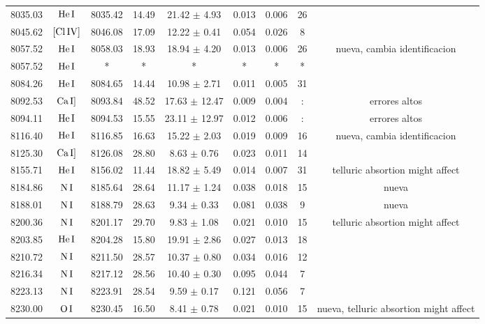 \documentclass{article}
\begin{document}
\begin{table*}
\begin{adjustbox}{width=\textwidth}
\begin{tabular}{ccccccccc}
8035.03 & $\mbox{He}\thinspace \mbox{I}$ & 8035.42 & 14.49 & 21.42 $\pm$ 4.93 & 0.013 & 0.006 & 26 &  \\
8045.62 & $\mbox{[Cl}\thinspace \mbox{IV]}$ & 8046.08 & 17.09 & 12.22 $\pm$ 0.41 & 0.054 & 0.026 & 8 &  \\
8057.52 & $\mbox{He}\thinspace \mbox{I}$ & 8058.03 & 18.93 & 18.94 $\pm$ 4.20 & 0.013 & 0.006 & 26 &  nueva, cambia identificacion \\
8057.52 & $\mbox{He}\thinspace \mbox{I}$ & * & * & * & * & * & * &  \\
8084.26 & $\mbox{He}\thinspace \mbox{I}$ & 8084.65 & 14.44 & 10.98 $\pm$ 2.71 & 0.011 & 0.005 & 31 &  \\
8092.53 & $\mbox{Ca}\thinspace \mbox{I]}$ & 8093.84 & 48.52 & 17.63 $\pm$ 12.47 & 0.009 & 0.004 & : &  errores altos \\
8094.11 & $\mbox{He}\thinspace \mbox{I}$ & 8094.53 & 15.55 & 23.11 $\pm$ 12.97 & 0.012 & 0.006 & : &  errores altos \\
8116.40 & $\mbox{He}\thinspace \mbox{I}$ & 8116.85 & 16.63 & 15.22 $\pm$ 2.03 & 0.019 & 0.009 & 16 &  nueva, cambia identificacion \\
8125.30 & $\mbox{Ca}\thinspace \mbox{I]}$ & 8126.08 & 28.80 & 8.63 $\pm$ 0.76 & 0.023 & 0.011 & 14 &  \\
8155.71 & $\mbox{He}\thinspace \mbox{I}$ & 8156.02 & 11.44 & 18.82 $\pm$ 5.49 & 0.014 & 0.007 & 31 &  telluric absortion might affect \\
8184.86 & $\mbox{N}\thinspace \mbox{I}$ & 8185.64 & 28.64 & 11.17 $\pm$ 1.24 & 0.038 & 0.018 & 15 &  nueva \\
8188.01 & $\mbox{N}\thinspace \mbox{I}$ & 8188.79 & 28.63 & 9.34 $\pm$ 0.33 & 0.081 & 0.038 & 9 &  nueva \\
8200.36 & $\mbox{N}\thinspace \mbox{I}$ & 8201.17 & 29.70 & 9.83 $\pm$ 1.08 & 0.021 & 0.010 & 15 &  telluric absortion might affect \\
8203.85 & $\mbox{He}\thinspace \mbox{I}$ & 8204.28 & 15.80 & 19.91 $\pm$ 2.86 & 0.027 & 0.013 & 18 &  \\
8210.72 & $\mbox{N}\thinspace \mbox{I}$ & 8211.50 & 28.57 & 10.37 $\pm$ 0.80 & 0.034 & 0.016 & 12 &  \\
8216.34 & $\mbox{N}\thinspace \mbox{I}$ & 8217.12 & 28.56 & 10.40 $\pm$ 0.30 & 0.095 & 0.044 & 7 &  \\
8223.13 & $\mbox{N}\thinspace \mbox{I}$ & 8223.91 & 28.54 & 9.59 $\pm$ 0.17 & 0.121 & 0.056 & 7 &  \\
8230.00 & $\mbox{O}\thinspace \mbox{I}$ & 8230.45 & 16.50 & 8.41 $\pm$ 0.78 & 0.021 & 0.010 & 15 &  nueva, telluric absortion might affect \\

\end{tabular}
\end{adjustbox}
\end{table*}
\end{document}
